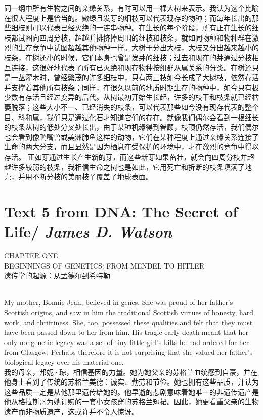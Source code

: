 \documentclass{article}
\begin{document}
同一纲中所有生物之间的亲缘关系，有时可以用一棵大树来表示。我认为这个比喻在很大程度上是恰当的。嫩绿且发芽的细枝可以代表现存的物种；而每年长出的那些细枝则可以代表已经灭绝的一连串物种。在生长的每个阶段，所有正在生长的细枝都试图向四周分枝，超越并排挤掉周围的细枝和枝条，就如同物种和物种群在激烈的生存竞争中试图超越其他物种一样。大树干分出大枝，大枝又分出越来越小的枝条，在树还小的时候，它们本身也曾是发芽的细枝；过去和现在的芽通过分枝相互连接，这很好地代表了所有已灭绝和现存物种按组群从属关系的分类。在树还只是一丛灌木时，曾经繁茂的许多细枝中，只有两三枝如今长成了大树枝，依然存活并支撑着其他所有枝条；同样，在很久以前的地质时期生存的物种中，如今只有极少数有存活且经过变异的后代。从树最初开始生长起，许多的枝干和枝条就已经枯萎脱落；这些大小不一、已经消失的枝条，可以代表那些如今没有现存代表的整个目、科和属，我们只是通过化石才知道它们的存在。就像我们偶尔会看到一根细长的枝条从树的低处分叉处长出，由于某种机缘得到眷顾，枝顶仍然存活，我们偶尔也会看到像鸭嘴兽或美洲肺鱼这样的动物，它们在某种程度上通过亲缘关系连接了生命的两大分支，而且显然是因为栖息在受保护的环境中，才在激烈的竞争中得以存活。 正如芽通过生长产生新的芽，而这些新芽如果茁壮，就会向四周分枝并超越许多较弱的枝条，我相信生命之树也是如此，它用死亡和折断的枝条填满了地壳，并用不断分枝的美丽枝丫覆盖了地球表面。 

\newpage


\section{Text 5 from DNA: The Secret of Life/ \textit{James D. Watson}}
\begin{center}
    CHAPTER ONE\\
    BEGINNINGS OF GENETICS: FROM MENDEL TO HITLER\\
    遗传学的起源：从孟德尔到希特勒\\
\end{center}

\\
My mother, Bonnie Jean, believed in genes. She was proud of her father’s Scottish origins, and saw in him the traditional Scottish virtues of honesty, hard work, and thriftiness. She, too, possessed these qualities and felt that they must have been passed down to her from him. His tragic early death meant that her only nongenetic legacy was a set of tiny little girl’s kilts he had ordered for her from Glasgow. Perhaps therefore it is not surprising that she valued her father’s biological legacy over his material one.\\
我的母亲，邦妮·琼，相信基因的力量。她为她父亲的苏格兰血统感到自豪，并在他身上看到了传统的苏格兰美德：诚实、勤劳和节俭。她也拥有这些品质，并认为这些品质一定是从他那里遗传给她的。他早逝的悲剧意味着她唯一的非遗传遗产是他从格拉斯哥为她订购的一套小女孩穿的苏格兰短裙。因此，她更看重父亲的生物遗产而非物质遗产，这或许并不令人惊讶。\\
\end{document}
